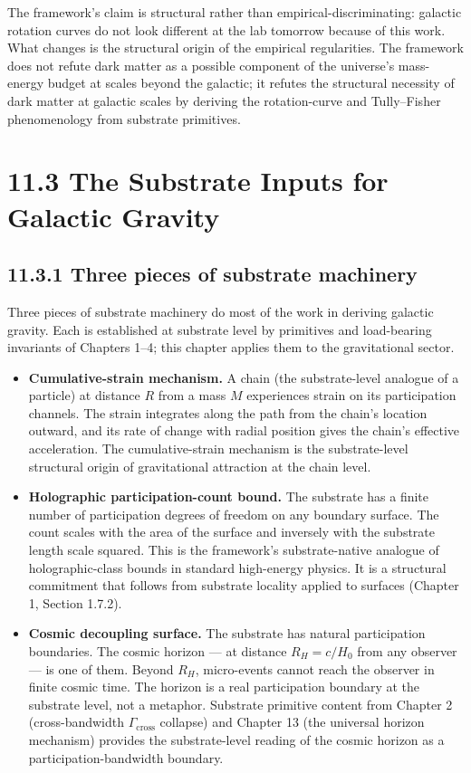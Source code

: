 \documentclass[11pt]{book}
\begin{document}
The framework's claim is structural rather than empirical-discriminating: galactic rotation curves do not look different at the lab tomorrow because of this work. What changes is the structural origin of the empirical regularities. The framework does not refute dark matter as a possible component of the universe's mass-energy budget at scales beyond the galactic; it refutes the structural necessity of dark matter at galactic scales by deriving the rotation-curve and Tully–Fisher phenomenology from substrate primitives.

\section{11.3 The Substrate Inputs for Galactic Gravity}

\subsection{11.3.1 Three pieces of substrate machinery}

Three pieces of substrate machinery do most of the work in deriving galactic gravity. Each is established at substrate level by primitives and load-bearing invariants of Chapters 1–4; this chapter applies them to the gravitational sector.

\begin{itemize}
\item \textbf{Cumulative-strain mechanism.} A chain (the substrate-level analogue of a particle) at distance $R$ from a mass $M$ experiences strain on its participation channels. The strain integrates along the path from the chain's location outward, and its rate of change with radial position gives the chain's effective acceleration. The cumulative-strain mechanism is the substrate-level structural origin of gravitational attraction at the chain level.
\item \textbf{Holographic participation-count bound.} The substrate has a finite number of participation degrees of freedom on any boundary surface. The count scales with the area of the surface and inversely with the substrate length scale squared. This is the framework's substrate-native analogue of holographic-class bounds in standard high-energy physics. It is a structural commitment that follows from substrate locality applied to surfaces (Chapter 1, Section 1.7.2).
\item \textbf{Cosmic decoupling surface.} The substrate has natural participation boundaries. The cosmic horizon — at distance $R_H = c/H_0$ from any observer — is one of them. Beyond $R_H$, micro-events cannot reach the observer in finite cosmic time. The horizon is a real participation boundary at the substrate level, not a metaphor. Substrate primitive content from Chapter 2 (cross-bandwidth $\Gamma_\mathrm{cross}$ collapse) and Chapter 13 (the universal horizon mechanism) provides the substrate-level reading of the cosmic horizon as a participation-bandwidth boundary.
\end{itemize}
\end{document}
